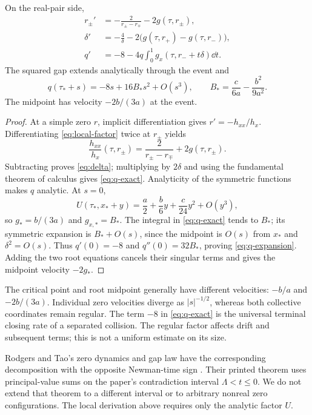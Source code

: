 \begin{proposition}\label{prop:gap}
On the real-pair side,
\begin{align}
 r_\pm'&=-\frac{2}{r_\pm-r_\mp}-2g(\tau,r_\pm),\label{eq:pair-motion}\\
 \delta'&=-\frac4\delta-2\bigl(g(\tau,r_+)-g(\tau,r_-)\bigr),\label{eq:delta}\\
 q'&=-8-4q\int_0^1g_x(\tau,r_-+t\delta)\dd t.\label{eq:q-exact}
\end{align}
The squared gap extends analytically through the event and
\begin{equation}\label{eq:q-expansion}
 q(\tau_*+s)=-8s+16B_*s^2+O(s^3),\qquad
 B_*=\frac{c}{6a}-\frac{b^2}{9a^2}.
\end{equation}
The midpoint has velocity \(-2b/(3a)\) at the event.
\end{proposition}
\begin{proof}
At a simple zero \(r\), implicit differentiation gives
\(r'=-h_{xx}/h_x\). Differentiating \eqref{eq:local-factor} twice
at \(r_\pm\) yields
\[
 \frac{h_{xx}}{h_x}(\tau,r_\pm)
 =\frac{2}{r_\pm-r_\mp}+2g(\tau,r_\pm).
\]
Subtracting proves \eqref{eq:delta}; multiplying by \(2\delta\) and
using the fundamental theorem of calculus gives \eqref{eq:q-exact}.
Analyticity of the symmetric functions makes \(q\) analytic.
At \(s=0\),
\[
 U(\tau_*,x_*+y)=\frac a2+\frac b6y+\frac c{24}y^2+O(y^3),
\]
so \(g_*=b/(3a)\) and \(g_{x,*}=B_*\).
The integral in \eqref{eq:q-exact} tends to \(B_*\); its symmetric
expansion is \(B_*+O(s)\), since the midpoint is \(O(s)\) from \(x_*\)
and \(\delta^2=O(s)\). Thus \(q'(0)=-8\) and \(q''(0)=32B_*\),
proving \eqref{eq:q-expansion}. Adding the two root equations cancels
their singular terms and gives the midpoint velocity \(-2g_*\).
\end{proof}

The critical point and root midpoint generally have different velocities:
\(-b/a\) and \(-2b/(3a)\). Individual zero velocities diverge as
\(|s|^{-1/2}\), whereas both collective coordinates remain regular.
The term \(-8\) in \eqref{eq:q-exact} is the universal terminal closing
rate of a separated collision. The regular factor affects drift
and subsequent terms; this is not a uniform estimate on its size.

Rodgers and Tao's zero dynamics and gap law have the corresponding
decomposition with the opposite Newman-time sign
\cite[Section~4, Theorem~4.16 and Lemma~4.18(i)]{RodgersTao2020}.
Their printed theorem uses principal-value sums on the paper's
contradiction interval \(\Lambda<t\leq0\). We do not extend that theorem
to a different interval or to arbitrary nonreal zero configurations.
The local derivation above requires only the analytic factor \(U\).


